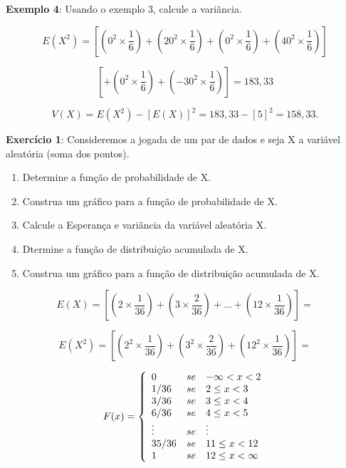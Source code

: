 \documentclass[a4paper,12pt]{report}
\begin{document}
{\textbf{Exemplo 4}: Usando o exemplo 3, calcule a variãncia.


$$
E(X^{2})= \left[\left(0^{2} \times \frac{1}{6}\right)+\left(20^{2}
\times \frac{1}{6}\right)+ \left(0^{2} \times \frac{1}{6}\right)+
\left(40^{2} \times \frac{1}{6}\right)\right]
$$


$$
\left[+\left(0^{2} \times \frac{1}{6}\right)+\left(-30^{2} \times
\frac{1}{6}\right)\right]= 183,33
$$


$$
V(X) = E(X^{2})-[E(X)]^{2} = 183,33 - [5]^{2}= 158,33.
$$


\textbf{Exercício 1}: Consideremos a jogada de um par de dados e
seja X a variável aleatória (soma dos pontos).

\begin{enumerate}
    \item Determine a função de probabilidade de X.
    \item Construa um gráfico para a função de probabilidade de X.
    \item Calcule a Esperança e variância da variável aleatória X.
    \item Dtermine a função de distribuição acumulada de X.
    \item Construa um gráfico para a função de distribuição acumulada de X.
\end{enumerate}



\begin{table}[!htb] 
\end{table}

$$
E(X)= \left[\left(2 \times \frac{1}{36}\right)+\left(3 \times
\frac{2}{36}\right)+ \ldots +\left( 12 \times
\frac{1}{36}\right)\right]=
$$


$$
E(X^{2})= \left[\left(2^{2} \times \frac{1}{36}\right)+\left(3^{2}
\times \frac{2}{36}\right)+\left(12^{2} \times
\frac{1}{36}\right)\right]=
$$

$$
F(x)=
\left\{%
\begin{array}{ll}
   0      & se \quad \hbox{$-\infty < x < 2$} \\
   1/36   & se \quad \hbox{$2 \leq x < 3$} \\
   3/36   & se \quad \hbox{$3 \leq x < 4$} \\
   6/36   & se \quad \hbox{$4 \leq x < 5$} \\
   \vdots & se \quad \hbox{$\vdots$} \\
   35/36  & se \quad \hbox{$11 \leq x < 12$} \\
    1     & se \quad \hbox{$12 \leq x < \infty$} \\
\end{array}%
\right.
$$

}
\end{document}
